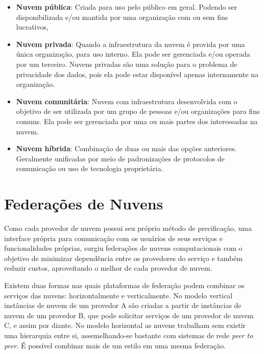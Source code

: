 \begin{itemize}
	\item \textbf{Nuvem pública}: Criada para uso pelo público em geral. Podendo ser disponibilizada e/ou mantida por uma organização com ou sem fins lucrativos, 
	\item \textbf{Nuvem privada}: Quando a infraestrutura da nuvem é provida por uma única organização, para uso interno. Ela pode ser gerenciada e/ou operada por um terceiro. Nuvens privadas são uma solução para o problema de privacidade dos dados, pois ela pode estar disponível apenas internamente na organização.
	\item \textbf{Nuvem comunitária}: Nuvem com infraestrutura desenvolvida com o objetivo de ser utilizada por um grupo de pessoas e/ou organizações para fins comuns. Ela pode ser gerenciada por uma ou mais partes dos interessadas na nuvem.
	\item \textbf{Nuvem híbrida}: Combinação de duas ou mais das opções anteriores. Geralmente unificadas por meio de padronizações de protocolos de comunicação ou uso de tecnologia proprietária.
\end{itemize}

\section{Federações de Nuvens}

Como cada provedor de nuvem possui seu próprio método de precificação, uma interface própria para comunicação com os usuários de seus serviços e funcionalidades próprias, surgiu federações de nuvens computacionais com o objetivo de minimizar dependência entre os provedores do serviço e também reduzir custos, aproveitando o melhor de cada provedor de nuvem.

Existem duas formas nas quais plataformas de federação podem combinar os serviços das nuvens: horizontalmente e verticalmente\cite{5557976}\cite{7835207}. No modelo vertical instâncias de nuvem de um provedor A são criadas a partir de instâncias de nuvem de um provedor B, que pode solicitar serviços de um provedor de nuvem C, e assim por diante. No modelo horizontal as nuvens trabalham sem existir uma hierarquia entre si, assemelhando-se bastante com sistemas de rede \textit{peer to peer}. É possível combinar mais de um estilo em uma mesma federação.


